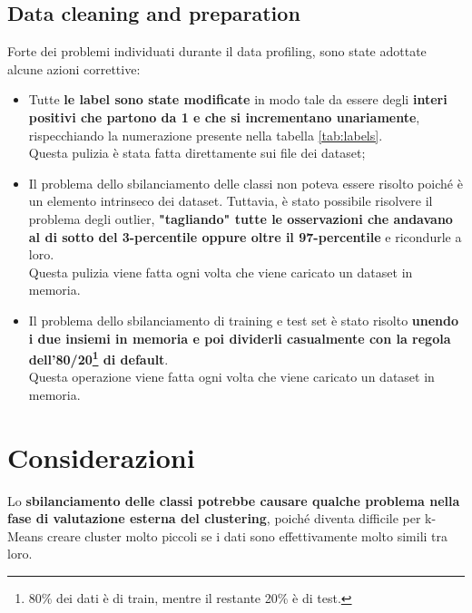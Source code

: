 \subsection{Data cleaning and preparation} \label{sec:cleaning}
Forte dei problemi individuati durante il data profiling, sono state adottate alcune azioni correttive:
\begin{itemize}
	\item Tutte \textbf{le label sono state modificate} in modo tale da essere degli \textbf{interi positivi che partono da 1 e che si incrementano unariamente}, rispecchiando la numerazione presente nella tabella \ref{tab:labels}.\\
	Questa pulizia è stata fatta direttamente sui file dei dataset;
	
	\item Il problema dello sbilanciamento delle classi non poteva essere risolto poiché è un elemento intrinseco dei dataset. Tuttavia, è stato possibile risolvere il problema degli outlier, \textbf{"tagliando" tutte le osservazioni che andavano al di sotto del 3-percentile oppure oltre il 97-percentile} e ricondurle a loro.\\
	Questa pulizia viene fatta ogni volta che viene caricato un dataset in memoria.
	
	\item Il problema dello sbilanciamento di training e test set è stato risolto \textbf{unendo i due insiemi in memoria e poi dividerli casualmente con la regola dell'80/20\footnote{80\% dei dati è di train, mentre il restante 20\% è di test.} di default}.\\
	Questa operazione viene fatta ogni volta che viene caricato un dataset in memoria.
\end{itemize}

\section{Considerazioni} \label{sec:considerazioni}
Lo \textbf{sbilanciamento delle classi potrebbe causare qualche problema nella fase di valutazione esterna del clustering}, poiché diventa difficile per k-Means creare cluster molto piccoli se i dati sono effettivamente molto simili tra loro.
